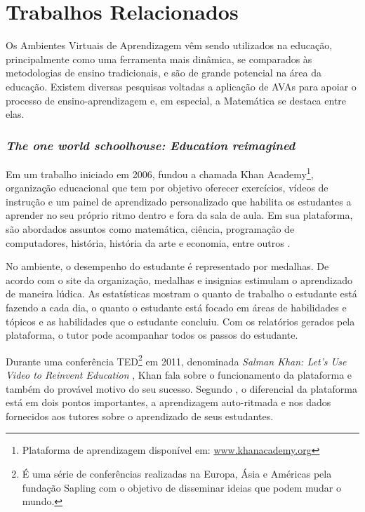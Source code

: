 \section{Trabalhos Relacionados}
\label{cap:trabalhos-relacionados}

Os Ambientes Virtuais de Aprendizagem vêm sendo utilizados na educação, principalmente como uma ferramenta mais dinâmica, se comparados \`as metodologias de ensino tradicionais, e são de 
grande potencial na área da educação. Existem diversas pesquisas voltadas a aplicação de AVAs para apoiar o processo de ensino-aprendizagem e, em especial, a Matemática se destaca entre elas.

\subsubsection{\textit{The one world schoolhouse: Education reimagined}}
Em um trabalho iniciado em 2006,  fundou a chamada Khan Academy\footnote{Plataforma de aprendizagem disponível em: \url{www.khanacademy.org}}, organização educacional que tem 
por objetivo oferecer exercícios, vídeos de instrução e um painel de aprendizado personalizado que habilita os estudantes a aprender no seu próprio ritmo dentro e fora da sala de aula. Em sua 
plataforma, são abordados assuntos como matemática, ciência, programação de computadores, história, história da arte e economia, entre outros \cite{khan2012one}.

No ambiente, o desempenho do estudante é representado por medalhas. De acordo com o site da organização, medalhas e insignias estimulam o aprendizado de maneira lúdica. As estatísticas mostram o 
quanto de trabalho o estudante está fazendo a cada dia, o quanto o estudante está focado em áreas de habilidades e tópicos e as habilidades que o estudante concluiu. Com os relatórios gerados pela 
plataforma, o tutor pode acompanhar todos os passos do estudante.

Durante uma conferência TED\footnote{É uma série de conferências realizadas na Europa, Ásia e Américas pela fundação Sapling com o objetivo de disseminar ideias que podem mudar o mundo.} em 2011, 
denominada \textit{Salman Khan: Let's Use Video to Reinvent Education} \cite{tedtalk2011reinvend}, Khan fala sobre o funcionamento da plataforma e também do provável motivo do seu sucesso. Segundo 
, o diferencial da plataforma está em dois pontos importantes, a aprendizagem auto-ritmada e nos dados fornecidos aos tutores sobre o aprendizado de seus estudantes. 

